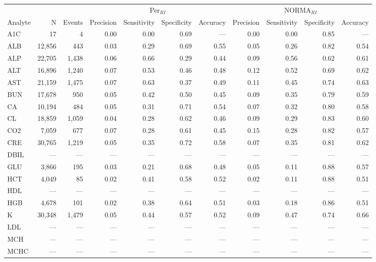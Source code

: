 \begin{table}[ht]
\centering
\footnotesize
\begin{tabular}{lrrrrrrrrrr}
\toprule
 & &  & \multicolumn{4}{c}{Per$_{RI}$} & \multicolumn{4}{c}{NORMA$_{RI}$} \\
\cmidrule(lr){4-7} \cmidrule(lr){8-11}
Analyte & N & Events & Precision & Sensitivity & Specificity & Accuracy & Precision & Sensitivity & Specificity & Accuracy \\
\midrule
A1C & 17 & 4 & 0.00 & 0.00 & 0.69 & --- & 0.00 & 0.00 & 0.85 & --- \\
ALB & 12,856 & 443 & 0.03 & 0.29 & 0.69 & 0.55 & 0.05 & 0.26 & 0.82 & 0.54 \\
ALP & 22,705 & 1,438 & 0.06 & 0.66 & 0.29 & 0.44 & 0.09 & 0.56 & 0.62 & 0.61 \\
ALT & 16,896 & 1,240 & 0.07 & 0.53 & 0.46 & 0.48 & 0.12 & 0.52 & 0.69 & 0.62 \\
AST & 21,159 & 1,475 & 0.07 & 0.63 & 0.37 & 0.49 & 0.11 & 0.45 & 0.74 & 0.63 \\
BUN & 17,678 & 950 & 0.05 & 0.42 & 0.50 & 0.45 & 0.09 & 0.35 & 0.79 & 0.59 \\
CA & 10,194 & 484 & 0.05 & 0.31 & 0.71 & 0.54 & 0.07 & 0.32 & 0.80 & 0.58 \\
CL & 18,859 & 1,059 & 0.04 & 0.28 & 0.62 & 0.46 & 0.09 & 0.29 & 0.83 & 0.60 \\
CO2 & 7,059 & 677 & 0.07 & 0.28 & 0.61 & 0.45 & 0.15 & 0.28 & 0.82 & 0.57 \\
CRE & 30,765 & 1,219 & 0.05 & 0.35 & 0.72 & 0.58 & 0.07 & 0.35 & 0.81 & 0.62 \\
DBIL & --- & --- & --- & --- & --- & --- & --- & --- & --- & --- \\
GLU & 3,866 & 195 & 0.03 & 0.21 & 0.68 & 0.48 & 0.05 & 0.11 & 0.88 & 0.57 \\
HCT & 4,049 & 85 & 0.02 & 0.41 & 0.58 & 0.52 & 0.02 & 0.11 & 0.88 & 0.51 \\
HDL & --- & --- & --- & --- & --- & --- & --- & --- & --- & --- \\
HGB & 4,678 & 101 & 0.02 & 0.38 & 0.64 & 0.51 & 0.03 & 0.18 & 0.86 & 0.51 \\
K & 30,348 & 1,479 & 0.05 & 0.44 & 0.57 & 0.52 & 0.09 & 0.47 & 0.74 & 0.66 \\
LDL & --- & --- & --- & --- & --- & --- & --- & --- & --- & --- \\
MCH & --- & --- & --- & --- & --- & --- & --- & --- & --- & --- \\
MCHC & --- & --- & --- & --- & --- & --- & --- & --- & --- & --- \\

\end{tabular}
\end{table}
